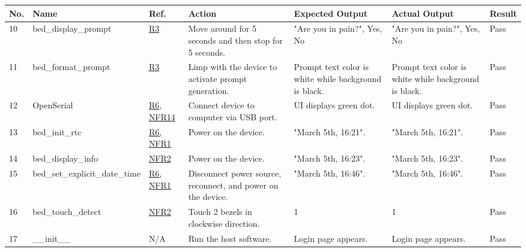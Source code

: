 \documentclass[12pt, titlepage]{article}
\begin{document}
\begin{center}
\begin{table} 
\begin{tabular}{ | p{0.5cm} | p{2.8cm} |  p{1.1cm} | p{2.7cm} | p{2.7cm} | p{2.7cm} | p{1.1cm} |}
\hline
\textbf{No.} & \textbf{Name}  & \textbf{Ref.} & \textbf{Action} & \textbf{Expected Output} & \textbf{Actual Output} & \textbf{Result} \\
\hline
10 & bed\_display\newline \_prompt & \href{https://github.com/zakerl/Capstone_Project/blob/main/docs/SRS/SRS.pdf}{R3} & Move around for 5 seconds and then stop for 5 seconds. & "Are you in pain?", Yes, No & "Are you in pain?", Yes, No & Pass \\ 
\hline
11 & bed\_format\newline \_prompt & \href{https://github.com/zakerl/Capstone_Project/blob/main/docs/SRS/SRS.pdf}{R3} & Limp with the device to activate prompt generation. & Prompt text color is white while background is black. & Prompt text color is white while background is black.  & Pass \\ 
\hline
12 & OpenSerial & \href{https://github.com/zakerl/Capstone_Project/blob/main/docs/SRS/SRS.pdf}{R6, NFR14} & Connect device to computer via USB port. & UI displays green dot. & UI displays green dot. & Pass \\ 
\hline
13 & bed\_init\_rtc & \href{https://github.com/zakerl/Capstone_Project/blob/main/docs/SRS/SRS.pdf}{R6, NFR1} & Power on the device. & "March 5th, 16:21". & "March 5th, 16:21". & Pass \\ 
\hline
14 & bed\_display\_info & \href{https://github.com/zakerl/Capstone_Project/blob/main/docs/SRS/SRS.pdf}{NFR2} & Power on the device. & "March 5th, 16:23". & "March 5th, 16:23". & Pass \\ 
\hline
15 & bed\_set\newline \_explicit\_date\newline \_time & \href{https://github.com/zakerl/Capstone_Project/blob/main/docs/SRS/SRS.pdf}{R6, NFR1} & Disconnect power source, reconnect, and power on the device. & "March 5th, 16:46". & "March 5th, 16:46". & Pass \\ 
\hline
16 & bed\_touch\newline \_detect & \href{https://github.com/zakerl/Capstone_Project/blob/main/docs/SRS/SRS.pdf}{NFR2} & Touch 2 bezels in clockwise direction. & 1 & 1 & Pass \\ 
\hline
17 & \_\_init\_\_ & N/A & Run the host software. & Login page appears. & Login page appears. & Pass \\ 

\end{tabular}
\end{table}
\end{center}
\end{document}
